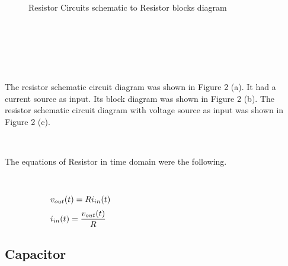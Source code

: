 \documentclass[10pt,a4paper]{article}
\begin{document}
\begin{CJK*}{UTF8}{gbsn}
\begin{figure}[H]
 \par \ \par\noindent \caption{Resistor Circuits schematic to Resistor blocks diagram}          
    \end{figure}

 \par \ \par\noindent \par \ \par
 \par \ \par\noindent The resistor schematic circuit diagram was shown in Figure 2 (a). It had a     current source as input. Its block diagram was shown in Figure 2 (b). The     resistor schematic circuit diagram with voltage source as input was shown     in Figure 2 (c). 
 \par \ \par\noindent The equations of Resistor in time domain were the following.
 \par \ \par\begin{equation}
 \begin{minipage}{250pt}
                \begin{flushleft} $\displaystyle v_{out}{\left(t \right)} = R i_{in}{\left(t \right)}$  \end{flushleft}
 \end{minipage}
 \end{equation}
\begin{equation}
 \begin{minipage}{250pt}
                \begin{flushleft} $\displaystyle i_{in}{\left(t \right)} = \frac{v_{out}{\left(t \right)}}{R}$  \end{flushleft}
 \end{minipage}
 \end{equation}
\noindent \subsection{Capacitor}
 \par \ \par\noindent \begin{figure}[H] \centering 


\end{figure}
\end{CJK*}
\end{document}
